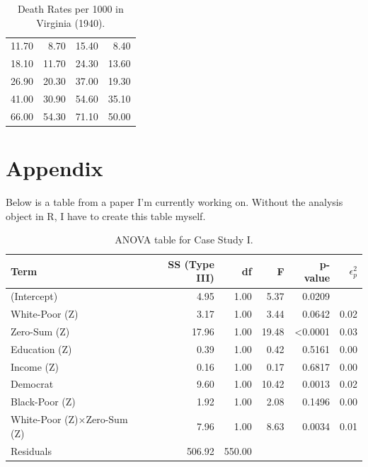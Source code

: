 \documentclass{article}\usepackage[]{graphicx}\usepackage[]{xcolor}
\begin{document}
\begin{multicols}{2}
\begin{table}[H]
\begin{tabular}{rrrr}
  \hline
11.70 & 8.70 & 15.40 & 8.40 \\ 
  18.10 & 11.70 & 24.30 & 13.60 \\ 
  26.90 & 20.30 & 37.00 & 19.30 \\ 
  41.00 & 30.90 & 54.60 & 35.10 \\ 
  66.00 & 54.30 & 71.10 & 50.00 \\ 
   \hline
\end{tabular}
\endgroup
\caption{Death Rates per 1000 in Virginia (1940).} 
\label{VADeaths.tab}
\end{table}







\vspace{2em}



\begin{tiny}

\end{tiny}
\end{multicols}

\newpage
\onecolumn
\section{Appendix}
Below is a table from a paper I’m currently working on. Without the analysis object in R, I have to create this table myself.

\begin{table}[H]
\begin{center}
\begin{tabular}{lrrrrr}\hline
Term & SS (Type III) & df & F & p-value & $\epsilon_p^2$\\\hline
(Intercept) &4.95 &1.00 &5.37 &0.0209\\
White-Poor (Z) &3.17 &1.00 &3.44 &0.0642 &0.02\\
Zero-Sum (Z) &17.96 &1.00 &19.48 &<0.0001 &0.03\\
Education (Z) &0.39 &1.00 &0.42 &0.5161 &0.00\\
Income (Z) &0.16 &1.00 &0.17 &0.6817 &0.00\\
Democrat &9.60 &1.00 &10.42 &0.0013 &0.02\\
Black-Poor (Z) &1.92 &1.00 &2.08 &0.1496 &0.00\\
White-Poor (Z)×Zero-Sum (Z) &7.96 &1.00 &8.63 &0.0034 &0.01\\
Residuals &506.92 &550.00 \\\hline
\end{tabular} 
\label{Table 2}
\caption{ANOVA table for Case Study I.}
\end{center}
\end{table}
\end{document}
